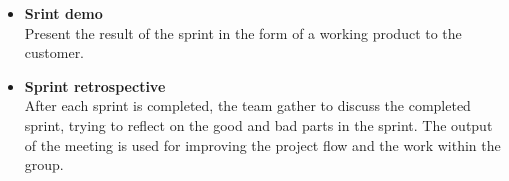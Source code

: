 \begin{itemize}
\item{\textbf{Srint demo}}\\
Present the result of the sprint in the form of a working product to the customer.

\item{\textbf{Sprint retrospective}}\\
After each sprint is completed, the team gather to discuss the completed sprint, trying to reflect on the good and bad parts
in the sprint. The output of the meeting is used for improving the project flow and the work within the group.
\end{itemize}
